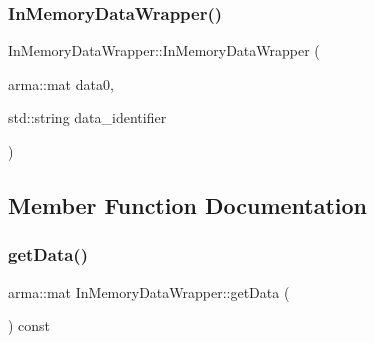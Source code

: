 \subsubsection{\texorpdfstring{In\+Memory\+Data\+Wrapper()}{InMemoryDataWrapper()}\hspace{0.1cm}{\footnotesize\ttfamily [2/2]}}
{\footnotesize\ttfamily In\+Memory\+Data\+Wrapper\+::\+In\+Memory\+Data\+Wrapper (\begin{DoxyParamCaption}\item[{arma\+::mat}]{data0,  }\item[{std\+::string}]{data\+\_\+identifier }\end{DoxyParamCaption})\hspace{0.3cm}{\ttfamily [inline]}}



\subsection{Member Function Documentation}
\mbox{\label{class_in_memory_data_wrapper_a69c754048807d42d8178914e8339a808}} 
\subsubsection{\texorpdfstring{get\+Data()}{getData()}}
{\footnotesize\ttfamily arma\+::mat In\+Memory\+Data\+Wrapper\+::get\+Data (\begin{DoxyParamCaption}{ }\end{DoxyParamCaption}) const\hspace{0.3cm}{\ttfamily [inline]}}


